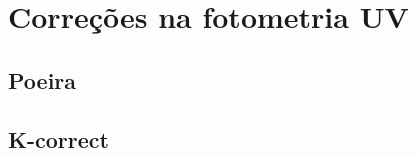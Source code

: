 

\section{Correções na fotometria UV}
\label{sec:Crossmatch:Correcoes}

\subsection{Poeira}

\subsection{K-correct}


